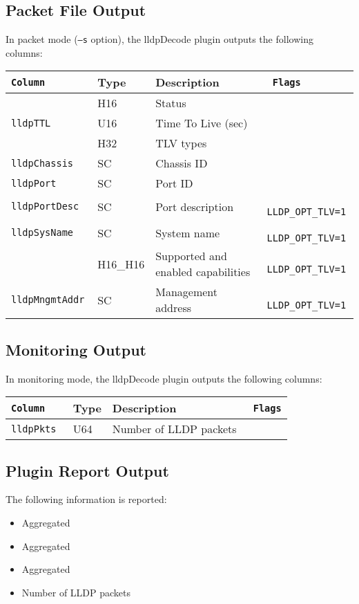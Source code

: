 \documentclass[documentation]{subfiles}
\begin{document}
\subsection{Packet File Output}
In packet mode ({\tt --s} option), the lldpDecode plugin outputs the following columns:
\begin{longtable}{>{\tt}lll>{\tt\small}l}
    \toprule
    {\bf Column} & {\bf Type} & {\bf Description} & {\bf Flags}\\
    \midrule\endhead%
    \nameref{lldpStat}     & H16      & Status                             & \\
    lldpTTL                & U16      & Time To Live (sec)                 & \\
    \nameref{lldpTLVTypes} & H32      & TLV types                          & \\
    lldpChassis            & SC       & Chassis ID                         & \\
    lldpPort               & SC       & Port ID                            & \\
    lldpPortDesc           & SC       & Port description                   & LLDP\_OPT\_TLV=1\\
    lldpSysName            & SC       & System name                        & LLDP\_OPT\_TLV=1\\
    \nameref{lldpCaps}     & H16\_H16 & Supported and enabled capabilities & LLDP\_OPT\_TLV=1\\
    lldpMngmtAddr          & SC       & Management address                 & LLDP\_OPT\_TLV=1\\
    \bottomrule
\end{longtable}

\subsection{Monitoring Output}
In monitoring mode, the lldpDecode plugin outputs the following columns:
\begin{longtable}{>{\tt}lll>{\tt\small}l}
    \toprule
    {\bf Column} & {\bf Type} & {\bf Description} & {\bf Flags}\\
    \midrule\endhead%
    lldpPkts & U64 & Number of LLDP packets & \\
    \bottomrule
\end{longtable}

\subsection{Plugin Report Output}
The following information is reported:
\begin{itemize}
    \item Aggregated {\tt{}}
    \item Aggregated {\tt{}}
    \item Aggregated {\tt{}}
    \item Number of LLDP packets
\end{itemize}
\end{document}
